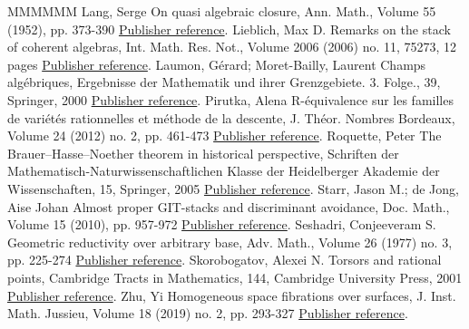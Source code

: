 \begin{thebibliography}{MMMMMM}
 Lang, Serge On quasi algebraic closure, Ann. Math., Volume 55 (1952), pp. 373-390 \href{https://ahl.centre-mersenne.org/item/AHL_2020__3__1399_0/#Lang52}{Publisher reference}.
 Lieblich, Max D. Remarks on the stack of coherent algebras, Int. Math. Res. Not., Volume 2006 (2006) no. 11, 75273, 12 pages \href{https://ahl.centre-mersenne.org/item/AHL_2020__3__1399_0/#Lieblich}{Publisher reference}.
 Laumon, Gérard; Moret-Bailly, Laurent Champs algébriques, Ergebnisse der Mathematik und ihrer Grenzgebiete. 3. Folge., 39, Springer, 2000 \href{https://ahl.centre-mersenne.org/item/AHL_2020__3__1399_0/#LM-B}{Publisher reference}.
 Pirutka, Alena R-équivalence sur les familles de variétés rationnelles et méthode de la descente, J. Théor. Nombres Bordeaux, Volume 24 (2012) no. 2, pp. 461-473 \href{https://ahl.centre-mersenne.org/item/AHL_2020__3__1399_0/#Pirutka}{Publisher reference}.
 Roquette, Peter The Brauer–Hasse–Noether theorem in historical perspective, Schriften der Mathematisch-Naturwissenschaftlichen Klasse der Heidelberger Akademie der Wissenschaften, 15, Springer, 2005 \href{https://ahl.centre-mersenne.org/item/AHL_2020__3__1399_0/#Roquette}{Publisher reference}.
 Starr, Jason M.; de Jong, Aise Johan Almost proper GIT-stacks and discriminant avoidance, Doc. Math., Volume 15 (2010), pp. 957-972 \href{https://ahl.centre-mersenne.org/item/AHL_2020__3__1399_0/#dJS8}{Publisher reference}.
 Seshadri, Conjeeveram S. Geometric reductivity over arbitrary base, Adv. Math., Volume 26 (1977) no. 3, pp. 225-274 \href{https://ahl.centre-mersenne.org/item/AHL_2020__3__1399_0/#Sesh}{Publisher reference}.
 Skorobogatov, Alexei N. Torsors and rational points, Cambridge Tracts in Mathematics, 144, Cambridge University Press, 2001 \href{https://ahl.centre-mersenne.org/item/AHL_2020__3__1399_0/#Sk}{Publisher reference}.
 Zhu, Yi Homogeneous space fibrations over surfaces, J. Inst. Math. Jussieu, Volume 18 (2019) no. 2, pp. 293-327 \href{https://ahl.centre-mersenne.org/item/AHL_2020__3__1399_0/#Zhu}{Publisher reference}.
\end{thebibliography}
